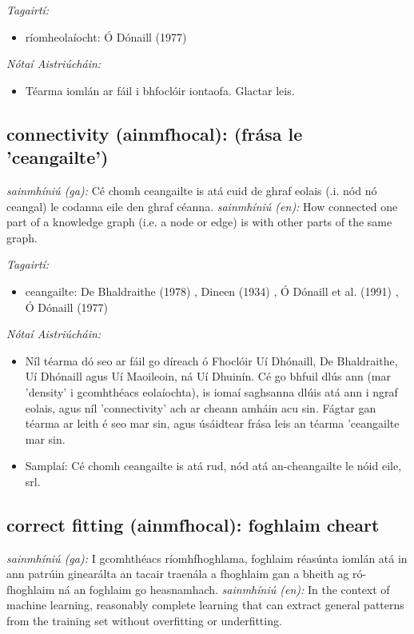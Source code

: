 \documentclass{article}
\begin{document}
 \noindent \textit{Tagairtí:}
\begin{itemize}
	\item ríomheolaíocht: Ó Dónaill (1977) \cite{odonaill}
\end{itemize}

 \noindent \textit{Nótaí Aistriúcháin:}
\begin{itemize}
	\item Téarma iomlán ar fáil i bhfoclóir iontaofa. Glactar leis.
\end{itemize}


\subsection*{connectivity (ainmfhocal): (frása le 'ceangailte')} 
 \noindent \textit{sainmhíniú (ga):} Cé chomh ceangailte is atá cuid de ghraf eolais (.i. nód nó ceangal) le codanna eile den ghraf céanna.
\newline\newline
 \noindent \textit{sainmhíniú (en):} How connected one part of a knowledge graph (i.e. a node or edge) is with other parts of the same graph.
\newline

 \noindent \textit{Tagairtí:}
\begin{itemize}
	\item ceangailte: De Bhaldraithe (1978) \cite{de-bhaldraithe}, Dineen (1934) \cite{dineen}, Ó Dónaill et al. (1991) \cite{focloir-beag}, Ó Dónaill (1977) \cite{odonaill}
\end{itemize}

 \noindent \textit{Nótaí Aistriúcháin:}
\begin{itemize}
	\item Níl téarma dó seo ar fáil go díreach ó Fhoclóir Uí Dhónaill, De Bhaldraithe, Uí Dhónaill agus Uí Maoileoin, ná Uí Dhuinín. Cé go bhfuil dlús ann (mar 'density' i gcomhthéacs eolaíochta), is iomaí saghsanna dlúis atá ann i ngraf eolais, agus níl 'connectivity' ach ar cheann amháin acu sin. Fágtar gan téarma ar leith é seo mar sin, agus úsáidtear frása leis an téarma 'ceangailte mar sin.
	\item Samplaí: Cé chomh ceangailte is atá rud, nód atá an-cheangailte le nóid eile, srl.
\end{itemize}


\subsection*{correct fitting (ainmfhocal): foghlaim cheart} 
 \noindent \textit{sainmhíniú (ga):} I gcomhthéacs ríomhfhoghlama, foghlaim réasúnta iomlán atá in ann patrúin ginearálta an tacair traenála a fhoghlaim gan a bheith ag ró-fhoghlaim ná an foghlaim go heasnamhach.
\newline\newline
 \noindent \textit{sainmhíniú (en):} In the context of machine learning, reasonably complete learning that can extract general patterns from the training set without overfitting or underfitting.
\newline
\end{document}
